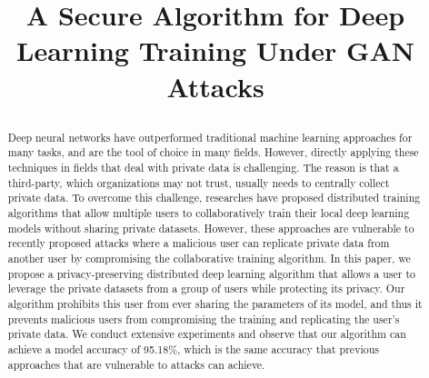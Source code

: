 \documentclass[conference]{IEEEtran}
\begin{document}
\title{{A Secure Algorithm for Deep Learning Training Under GAN Attacks}\\
\author{
}
}
\maketitle

\begin{abstract} 

Deep neural networks have outperformed traditional machine learning approaches for many tasks, and are the tool of choice in many
fields. However, directly applying these techniques in fields that deal with private data is
challenging. The reason is that a third-party, which organizations may not trust, usually needs to centrally collect private data. 
To overcome this challenge, researches have proposed distributed training algorithms that allow multiple users to collaboratively train
their local deep learning models without sharing private datasets. 
However, these approaches are vulnerable to recently proposed attacks where a malicious user can replicate private data from
another user  by compromising the collaborative training algorithm. 
In this paper, we propose a privacy-preserving distributed deep learning algorithm that allows a user to leverage the private
datasets from a group of users while protecting its privacy. Our algorithm prohibits this user from ever sharing the parameters of its
model, and thus it prevents malicious users from compromising the training and replicating the user's private data.  We conduct
extensive experiments and observe that our algorithm can achieve a  model accuracy of 95.18\%, which is the same
accuracy that previous approaches that are vulnerable to attacks can achieve. 
\end{abstract}
\end{document}
